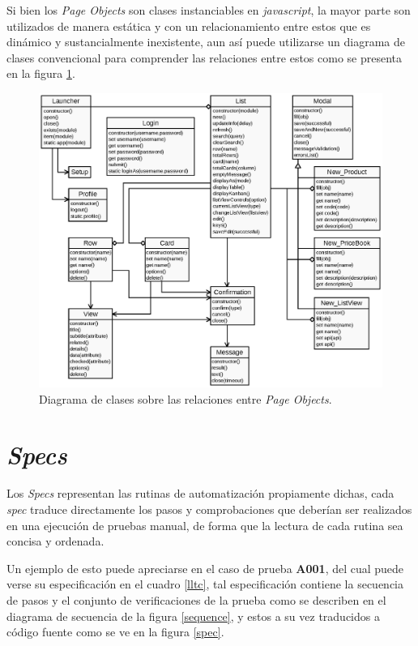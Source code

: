 Si bien los \emph{Page Objects} son clases instanciables en \emph{javascript},
la mayor parte son utilizados de manera estática y con un relacionamiento
entre estos que es dinámico y sustancialmente inexistente, aun así puede
utilizarse un diagrama de clases convencional para comprender las relaciones
entre estos como se presenta en la figura \ref{pom}.

\begin{figure}
\centering
\includegraphics[width=1.0\textwidth]{graphics/diagram01.eps}
\caption{Diagrama de clases sobre las relaciones entre \emph{Page Objects}.}
\label{pom}
\end{figure}

\section{\emph{Specs}}
Los \emph{Specs} representan las rutinas de automatización propiamente dichas,
cada \emph{spec} traduce directamente los pasos y comprobaciones que deberían
ser realizados en una ejecución de pruebas manual, de forma que la lectura de
cada rutina sea concisa y ordenada.

Un ejemplo de esto puede apreciarse en el caso de prueba \textbf{A001}, del cual
puede verse su especificación en el cuadro \ref{lltc}, tal especificación
contiene la secuencia de pasos y el conjunto de verificaciones de la prueba como
se describen en el diagrama de secuencia de la figura \ref{sequence}, y estos a
su vez traducidos a código fuente como se ve en la figura \ref{spec}.

